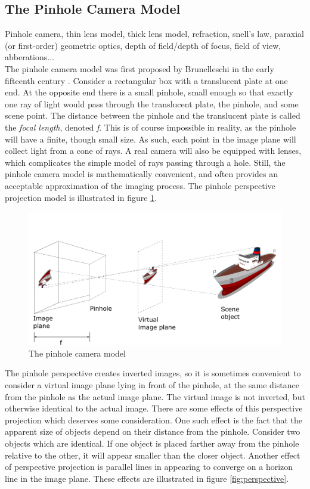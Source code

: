 \subsection{The Pinhole Camera Model}
\label{section:pinhole}
Pinhole camera, thin lens model, thick lens model, refraction, snell's law, paraxial (or first-order) geometric optics, depth of field/depth of focus, field of view, abberations... \smallskip \\
The pinhole camera model was first proposed by Brunelleschi in the early fifteenth century \cite{modernCV}. Consider a rectangular box with a translucent plate at one end. At the opposite end there is a small pinhole, small enough so that exactly one ray of light would pass through the translucent plate, the pinhole, and some scene point. The distance between the pinhole and the translucent plate is called the \textit{focal length}, denoted \textit{f}. This is of course impossible in reality, as the pinhole will have a finite, though small size. As such, each point in the image plane will collect light from a cone of rays. A real camera will also be equipped with lenses, which complicates the simple model of rays passing through a hole. Still, the pinhole camera model is mathematically convenient, and often provides an acceptable approximation of the imaging process. The pinhole perspective projection model is illustrated in figure \ref{fig:pinhole_model}.
\begin{figure}[H]
    \centering
    \includegraphics[width=\linewidth]{pinhole.png}
    \caption{The pinhole camera model}
    \label{fig:pinhole_model}
\end{figure}
The pinhole perspective creates inverted images, so it is sometimes convenient to consider a virtual image plane lying in front of the pinhole, at the same distance from the pinhole as the actual image plane. The virtual image is not inverted, but otherwise identical to the actual image. There are some effects of this perspective projection which deserves some consideration. One such effect is the fact that the apparent size of objects depend on their distance from the pinhole. Consider two objects which are identical. If one object is placed farther away from the pinhole relative to the other, it will appear smaller than the closer object. Another effect of perspective projection is parallel lines in appearing to converge on a horizon line in the image plane. These effects are illustrated in figure \ref{fig:perspective}.
